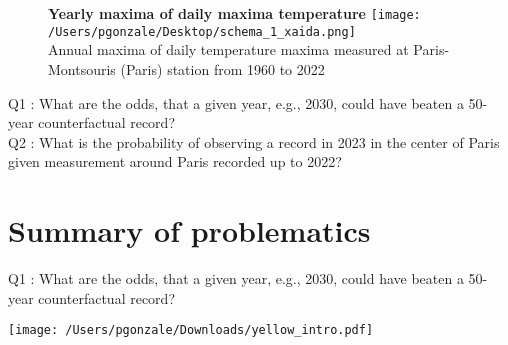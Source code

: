 \documentclass[9pt,compress]{beamer}
\begin{document}
%
%
%
\begin{frame}%
\begin{figure}
\centering
    {\small\textbf{Yearly maxima of daily maxima temperature}}
\texttt{[image: /Users/pgonzale/Desktop/schema\_1\_xaida.png]}\\
{\tiny Annual maxima of daily temperature maxima measured {at \color{red} Paris-Montsouris (Paris) station}  from 1960 to 2022}
\end{figure}

\begin{tcolorbox}[title= Questions of study]
 {\color{beamer@blendedblue}Q1 : }What are the odds, that a given year, e.g., 2030, could have beaten a 50-year counterfactual record?\\ 
 {\color{beamer@blendedblue}Q2 : } \pause What is the probability of observing a record in 2023 in the center of Paris given measurement around Paris recorded up to 2022?
\end{tcolorbox}

\end{frame}
%
%
%
\section{Summary of problematics}
\begin{frame}{Q1 : What are the odds, that a given year, e.g., 2030, could have beaten a 50-year counterfactual record? }
\begin{center}
\texttt{[image: /Users/pgonzale/Downloads/yellow\_intro.pdf]}
 \end{center}    
 \pause


\end{frame}
%
%
%
\end{document}
